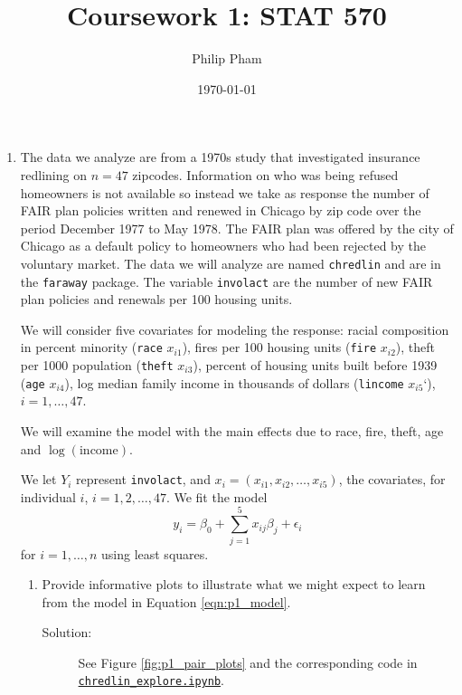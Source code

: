 \documentclass[letterpaper,11pt]{article}
\title{Coursework 1: STAT 570}
\author{Philip Pham}
\date{\today}
\begin{document}
\maketitle

\begin{enumerate}
\item The data we analyze are from a 1970s study that investigated insurance
  redlining on $n = 47$ zipcodes. Information on who was being refused
  homeowners is not available so instead we take as response the number of FAIR
  plan policies written and renewed in Chicago by zip code over the period
  December 1977 to May 1978. The FAIR plan was offered by the city of Chicago as
  a default policy to homeowners who had been rejected by the voluntary market.
  The data we will analyze are named \texttt{chredlin} and are in the
  \texttt{faraway} package. The variable \texttt{involact} are the number of new
  FAIR plan policies and renewals per 100 housing units.

  We will consider five covariates for modeling the response: racial composition
  in percent minority (\texttt{race} $x_{i1}$), fires per 100 housing units
  (\texttt{fire} $x_{i2}$), theft per 1000 population (\texttt{theft} $x_{i3}$),
  percent of housing units built before 1939 (\texttt{age} $x_{i4}$), log
  median family income in thousands of dollars (\texttt{lincome} $x_{i5}$`),
  $i = 1,\ldots,47$.

  We will examine the model with the main effects due to race, fire, theft, age
  and $\log(\mathrm{income})$.

  We let $Y_i$ represent \texttt{involact}, and
  $x_i = \left(x_{i1}, x_{i2}, \ldots, x_{i5}\right)$, the covariates, for
  individual $i$, $i = 1,2,\ldots,47$. We fit the model
  \begin{equation}
    y_i = \beta_0 + \sum_{j=1}^5x_{ij}\beta_j + \epsilon_i
    \label{eqn:p1_model}
  \end{equation}
  for $i=1,\ldots,n$ using least squares.

  \begin{enumerate}
  \item Provide informative plots to illustrate what we might expect to learn
    from the model in Equation \ref{eqn:p1_model}.
    \label{part:p1a}

    \begin{description}
    \item[Solution:] See Figure \ref{fig:p1_pair_plots} and the corresponding
      code in
      \href{https://nbviewer.jupyter.org/github/ppham27/stat570/blob/master/hw1/chredlin\_explore.ipynb}{\texttt{chredlin\_explore.ipynb}}.


\end{description}
\end{enumerate}
\end{enumerate}
\end{document}
